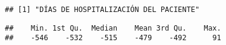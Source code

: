 \documentclass[]{article}
\newenvironment{Shaded}{\begin{snugshade}}{\end{snugshade}}
\newcommand{\KeywordTok}[1]{\textcolor[rgb]{0.13,0.29,0.53}{\textbf{#1}}}
\newcommand{\NormalTok}[1]{#1}
\newcommand{\OperatorTok}[1]{\textcolor[rgb]{0.81,0.36,0.00}{\textbf{#1}}}
\newcommand{\StringTok}[1]{\textcolor[rgb]{0.31,0.60,0.02}{#1}}
\begin{document}
\begin{verbatim}
## [1] "DÍAS DE HOSPITALIZACIÓN DEL PACIENTE"
\end{verbatim}

\begin{Shaded}
\end{Shaded}

\begin{verbatim}
##    Min. 1st Qu.  Median    Mean 3rd Qu.    Max. 
##    -546    -532    -515    -479    -492      91
\end{verbatim}

\begin{Shaded}
\end{Shaded}
\end{document}
